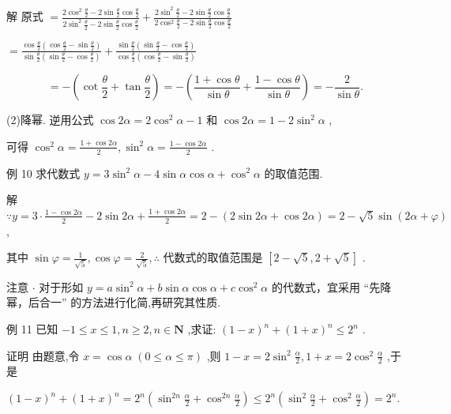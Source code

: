 \documentclass[10pt]{article}
\begin{document}
解 原式 \(= \frac{2{\cos }^{2}\frac{\theta }{2} - 2\sin \frac{\theta }{2}\cos \frac{\theta }{2}}{2{\sin }^{2}\frac{\theta }{2} - 2\sin \frac{\theta }{2}\cos \frac{\theta }{2}} + \frac{2{\sin }^{2}\frac{\theta }{2} - 2\sin \frac{\theta }{2}\cos \frac{\theta }{2}}{2{\cos }^{2}\frac{\theta }{2} - 2\sin \frac{\theta }{2}\cos \frac{\theta }{2}}\)

\(= \frac{\cos \frac{\theta }{2}\left( {\cos \frac{\theta }{2} - \sin \frac{\theta }{2}}\right) }{\sin \frac{\theta }{2}\left( {\sin \frac{\theta }{2} - \cos \frac{\theta }{2}}\right) } + \frac{\sin \frac{\theta }{2}\left( {\sin \frac{\theta }{2} - \cos \frac{\theta }{2}}\right) }{\cos \frac{\theta }{2}\left( {\cos \frac{\theta }{2} - \sin \frac{\theta }{2}}\right) }\)

\[
=  - \left( {\cot \frac{\theta }{2} + \tan \frac{\theta }{2}}\right)  =  - \left( {\frac{1 + \cos \theta }{\sin \theta } + \frac{1 - \cos \theta }{\sin \theta }}\right)  =  - \frac{2}{\sin \theta }.
\]

(2)降幂. 逆用公式 \(\cos {2\alpha } = 2{\cos }^{2}\alpha  - 1\) 和 \(\cos {2\alpha } = 1 - 2{\sin }^{2}\alpha\) ,

可得 \({\cos }^{2}\alpha  = \frac{1 + \cos {2\alpha }}{2},{\sin }^{2}\alpha  = \frac{1 - \cos {2\alpha }}{2}\) .

例 10 求代数式 \(y = 3{\sin }^{2}\alpha  - 4\sin \alpha \cos \alpha  + {\cos }^{2}\alpha\) 的取值范围.

解 \(\because y = 3 \cdot  \frac{1 - \cos {2\alpha }}{2} - 2\sin {2\alpha } + \frac{1 + \cos {2\alpha }}{2} = 2 - \left( {2\sin {2\alpha } + \cos {2\alpha }}\right)  = 2 - \sqrt{5}\sin \left( {{2\alpha } + \varphi }\right)\) ,

其中 \(\sin \varphi  = \frac{1}{\sqrt{5}},\cos \varphi  = \frac{2}{\sqrt{5}},\therefore\) 代数式的取值范围是 \(\left\lbrack  {2 - \sqrt{5},2 + \sqrt{5}}\right\rbrack\) .

注意 \(\cdot\) 对于形如 \(y = a{\sin }^{2}\alpha  + b\sin \alpha \cos \alpha  + c{\cos }^{2}\alpha\) 的代数式，宜采用 “先降幂，后合一” 的方法进行化简,再研究其性质.

例 11 已知 \(- 1 \leq  x \leq  1,n \geq  2,n \in  \mathbf{N}\) ,求证: \({\left( 1 - x\right) }^{n} + {\left( 1 + x\right) }^{n} \leq  {2}^{n}\) .

证明 由题意,令 \(x = \cos \alpha \;\left( {0 \leq  \alpha  \leq  \pi }\right)\) ,则 \(1 - x = 2{\sin }^{2}\frac{\alpha }{2},1 + x = 2{\cos }^{2}\frac{\alpha }{2}\) ,于是

\({\left( 1 - x\right) }^{n} + {\left( 1 + x\right) }^{n} = {2}^{n}\left( {{\sin }^{2n}\frac{\alpha }{2} + {\cos }^{2n}\frac{\alpha }{2}}\right)  \leq  {2}^{n}\left( {{\sin }^{2}\frac{\alpha }{2} + {\cos }^{2}\frac{\alpha }{2}}\right)  = {2}^{n}.\)
\end{document}
